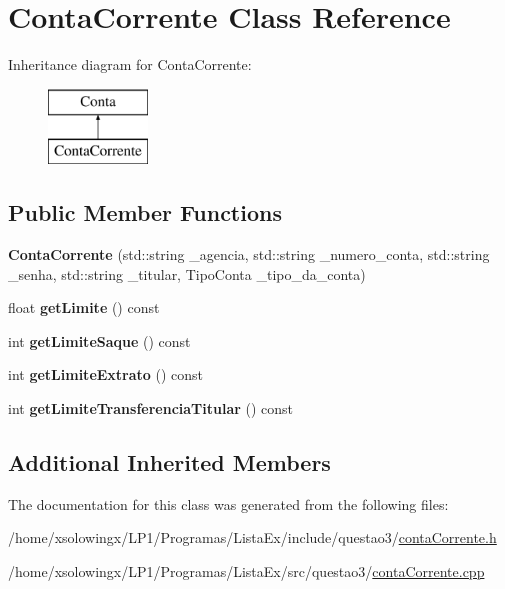 \hypertarget{classContaCorrente}{}\section{Conta\+Corrente Class Reference}
\label{classContaCorrente}
Inheritance diagram for Conta\+Corrente\+:\begin{figure}[H]
\begin{center}
\leavevmode
\includegraphics[height=2.000000cm]{classContaCorrente}
\end{center}
\end{figure}
\subsection*{Public Member Functions}
\begin{DoxyCompactItemize}
\item 
\mbox{\label{classContaCorrente_a4966c27e501949d89d57661d7e15b500}} 
{\bfseries Conta\+Corrente} (std\+::string \+\_\+agencia, std\+::string \+\_\+numero\+\_\+conta, std\+::string \+\_\+senha, std\+::string \+\_\+titular, Tipo\+Conta \+\_\+tipo\+\_\+da\+\_\+conta)
\item 
\mbox{\label{classContaCorrente_a922280174c72536f9c7fab57e211e979}} 
float {\bfseries get\+Limite} () const
\item 
\mbox{\label{classContaCorrente_ae408fca46febd65fc87bc875510b3414}} 
int {\bfseries get\+Limite\+Saque} () const
\item 
\mbox{\label{classContaCorrente_a2fa3869476cf98747e6ffd485c620c2e}} 
int {\bfseries get\+Limite\+Extrato} () const
\item 
\mbox{\label{classContaCorrente_a9e19f26b74af3203c6bce445f863decf}} 
int {\bfseries get\+Limite\+Transferencia\+Titular} () const
\end{DoxyCompactItemize}
\subsection*{Additional Inherited Members}


The documentation for this class was generated from the following files\+:\begin{DoxyCompactItemize}
\item 
/home/xsolowingx/\+L\+P1/\+Programas/\+Lista\+Ex/include/questao3/\hyperlink{contaCorrente_8h}{conta\+Corrente.\+h}\item 
/home/xsolowingx/\+L\+P1/\+Programas/\+Lista\+Ex/src/questao3/\hyperlink{contaCorrente_8cpp}{conta\+Corrente.\+cpp}\end{DoxyCompactItemize}
